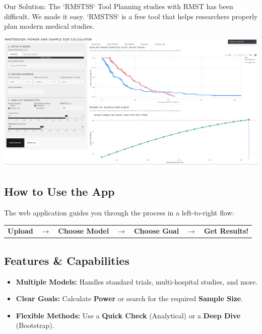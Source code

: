 \documentclass[a0,landscape]{a0poster}
\begin{document}
\begin{minipage}[t][\dimexpr\textheight-1cm\relax][t]{0.34\linewidth} %

\begin{posterbox}{Our Solution: The `RMSTSS` Tool}
    \Large
    Planning studies with RMST has been difficult. We made it easy. `RMSTSS` is a free tool that helps researchers properly plan modern medical studies.
    
    \begin{center}
        \vspace{0.5cm}
        \includegraphics[width=0.9\linewidth]{app-ss.png}
        \vspace{0.5cm}
    \end{center}
    
    \subsection*{\Large How to Use the App}
    \Large
    The web application guides you through the process in a left-to-right flow:
    \begin{center}
        \Large
        \begin{tabular}{ccccccc}
            \textbf{Upload} & $\boldsymbol{\rightarrow}$ & \textbf{Choose Model} & $\boldsymbol{\rightarrow}$ & \textbf{Choose Goal} & $\boldsymbol{\rightarrow}$ & \textbf{Get Results!} \\
        \end{tabular}
    \end{center}

    \subsection*{\Large Features \& Capabilities}
    \begin{itemize} \itemsep=0.5em
        \item \Large \textbf{Multiple Models:} Handles standard trials, multi-hospital studies, and more.
        \item \Large \textbf{Clear Goals:} Calculate \textbf{Power} or search for the required \textbf{Sample Size}.
        \item \Large \textbf{Flexible Methods:} Use a \textbf{Quick Check} (Analytical) or a \textbf{Deep Dive} (Bootstrap).
    \end{itemize}
    

\end{posterbox}
\end{minipage}
\end{document}
